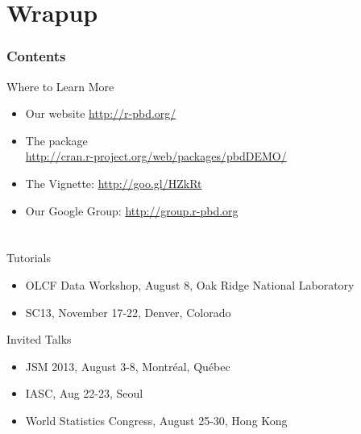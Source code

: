 \section{Wrapup}

\hidenum
\begin{frame}[noframenumbering]
\frametitle{Contents}
 \tableofcontents[currentsection,hideothersubsections,sectionstyle=show/hide]
\end{frame}
\shownum

\begin{frame}
  \begin{block}{Where to Learn More}
    \begin{itemize}
      \item Our website \url{http://r-pbd.org/}
      \item The  package\\
      \url{http://cran.r-project.org/web/packages/pbdDEMO/}\\
      \item The  Vignette: \url{http://goo.gl/HZkRt}
      \item Our Google Group: \url{http://group.r-pbd.org}
    \end{itemize}
\end{block}
\end{frame}


\section*{}


\begin{frame}
  \begin{block}{Tutorials}
  \begin{itemize}
    \item {\small OLCF Data Workshop, August 8, Oak Ridge National Laboratory}
    \item {\small SC13, November 17-22, Denver, Colorado}
  \end{itemize}
  \end{block}
  \begin{block}{Invited Talks}
  \begin{itemize}
    \item {\small JSM 2013, August 3-8, Montr\'eal, Qu\'ebec }
    \item {\small IASC, Aug 22-23, Seoul}
    \item {\small World Statistics Congress, August 25-30, Hong Kong }
  \end{itemize}
  \end{block}
\end{frame}



